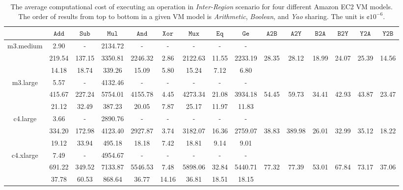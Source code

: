 \documentclass{llncs}
\begin{document}
\vspace{-0.3cm}
\begin{table*}[hbt]
	\scriptsize
	\centering
	\begin{tabular}{|c|c|c|c|c|c|c|c|c|c|c|c|c|c|c|}
	
	\cline{2-15}
	 \multicolumn{1}{c|}{} & $\mathtt{Add}$ & $\mathtt{Sub}$ & $\mathtt{Mul}$ & $\mathtt{And}$ & $\mathtt{Xor}$ & $\mathtt{Mux}$ & $\mathtt{Eq}$ & $\mathtt{Ge}$ & $\mathtt{A2B}$ & $\mathtt{A2Y}$ & $\mathtt{B2A}$ & $\mathtt{B2Y}$ & $\mathtt{Y2A}$ & $\mathtt{Y2B}$ \\
	\hline

	\multirow{3}{*}{m3.medium}
		& 2.90		& -		& 2134.72	& -		& -		& -		& -		& -		&  	&  	&  	&  	&  	&  \\
		& 219.54	& 137.15	& 3350.81	& 2246.32	& 2.86	& 2122.63	& 11.55	& 2233.19	& 28.35	& 28.12	& 18.99	& 24.07	& 25.39	& 14.56 \\
		& 14.18		& 18.74	& 339.26	& 15.09	& 5.80	& 15.24	& 7.12	& 6.80	&  	&  	&  	&  	&  	&  \\
	\hline

	\multirow{3}{*}{m3.large}
		& 5.57		& -		& 4132.46	& -		& -		& -		& -		& -		&  	&  	&  	&  	&  	&  \\
		& 415.67	& 227.24	& 5754.01	& 4155.78	& 4.45	& 4273.34	& 21.08	& 3934.18	& 54.45	& 59.73	& 34.41	& 42.93	& 43.87	& 23.47 \\
		& 21.12		& 32.49	& 387.23	& 20.05	& 7.87	& 25.17	& 11.97	& 11.83	&  	&  	&  	&  	&  	&  \\
	\hline		

	\multirow{3}{*}{c4.large}
		& 3.66		& -		& 2890.76	& -		& -		& -		& -		& -		&  	&  	&  	&  	&  	&  \\
		& 334.20	& 172.98	& 4123.40	& 2927.87	& 3.74	& 3182.07	& 16.36	& 2759.07	& 38.83	& 389.98	& 26.01	& 32.99	& 35.12	& 18.22 \\
		& 19.12		& 33.94	& 495.18	& 18.18	& 7.42	& 18.81	& 9.14	& 9.01	&  	&  	&  	&  	&  	&  \\
	\hline

	\multirow{3}{*}{c4.xlarge}
		& 7.49		& -		& 4954.67	& -		& -		& -		& -		& -		&  	&  	&  	&  	&  	&  \\
		& 691.22	& 349.52	& 7133.87	& 5546.53	& 7.48	& 5898.06	& 32.84	& 5440.71	& 77.32	& 77.39	& 53.01	& 67.84	& 73.17	& 37.06 \\
		& 37.78		& 60.53	& 868.64	& 36.77	& 14.16	& 36.81	& 18.51	& 18.15	&  	&  	&  	&  	&  	&  \\
	\hline
	\end{tabular}

	\caption{The average computational cost of executing an operation in \emph{Inter-Region} scenario for four different Amazon EC2 VM models. The order of results from top to bottom in a given VM model is \emph{Arithmetic}, \emph{Boolean}, and \emph{Yao} sharing. The unit is $\cent10^{-6}$.}
	\label{table:cost:online_computation}
\end{table*}
\end{document}
